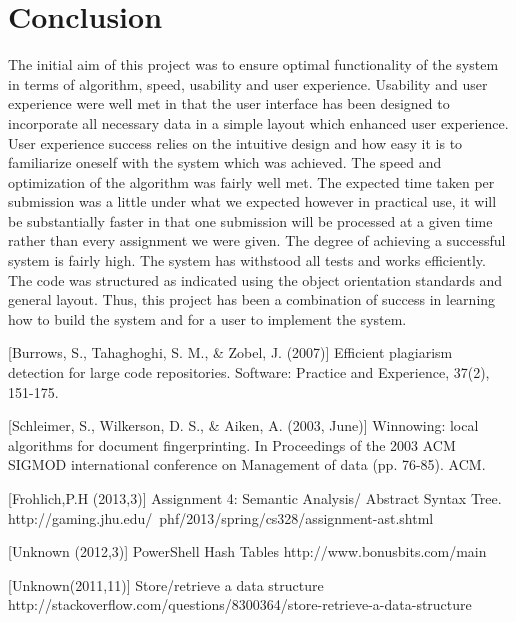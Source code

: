 \documentclass[11pt,a4paper]{article}
\begin{document}
\section{Conclusion}
\label{ss:conclusion}

The initial aim of this project was to ensure optimal functionality of the system in terms of algorithm, speed, usability and user experience. Usability and user experience were well met in that the user interface has been designed to incorporate all necessary data in a simple layout which enhanced user experience. User experience success relies on the intuitive design and how easy it is to familiarize oneself with the system which was achieved. The speed and optimization of the algorithm was fairly well met. The expected time taken per submission was a little under what we expected however in practical use, it will be substantially faster in that one submission will be processed at a given time rather than every assignment we were given. The degree of achieving a successful system is fairly high. The system has withstood all tests and works efficiently. The code was structured as indicated using the object orientation standards and general layout. Thus, this project has been a combination of success in learning how to build the system and for a user to implement the system.

\begin{thebibliography}{51}

 [Burrows, S., Tahaghoghi, S. M., \& Zobel, J. (2007)]
Efficient plagiarism detection for large code repositories. Software: Practice and Experience, 37(2), 151-175.

 [Schleimer, S., Wilkerson, D. S., \& Aiken, A. (2003, June)]
Winnowing: local algorithms for document fingerprinting. In Proceedings of the 2003 ACM SIGMOD international conference on Management of data (pp. 76-85). ACM.

 [Frohlich,P.H (2013,3)]
Assignment 4: Semantic Analysis/ Abstract Syntax Tree. 
http://gaming.jhu.edu/~phf/2013/spring/cs328/assignment-ast.shtml

 [Unknown (2012,3)]
PowerShell Hash Tables 
http://www.bonusbits.com/main

 [Unknown(2011,11)]
Store/retrieve a data structure
http://stackoverflow.com/questions/8300364/store-retrieve-a-data-structure

\end{thebibliography}
\end{document}

